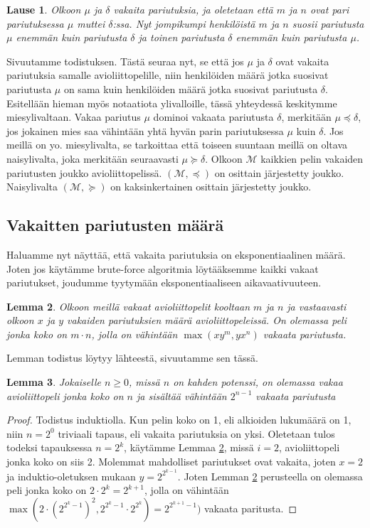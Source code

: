 \documentclass[finnish]{tktltiki2}
\newtheorem{lau}{Lause}
\newtheorem{lem}[lau]{Lemma}
\theoremstyle{definition}
\theoremstyle{remark}
\begin{document}
\begin{lau} \cite[p. 18]{gusfield1989stable}\label{lause-guspref}
	Olkoon $\mu$ ja $\delta$ vakaita pariutuksia, ja oletetaan että $m$ ja $n$ ovat pari pariutuksessa $\mu$ muttei $\delta$:ssa. Nyt jompikumpi henkilöistä $m$ ja $n$ suosii pariutusta $\mu$ enemmän kuin pariutusta $\delta$ ja toinen pariutusta $\delta$ enemmän kuin pariutusta $\mu$.
\end{lau}
Sivuutamme todistuksen.
Tästä seuraa nyt, se että jos $\mu$ ja $\delta$ ovat vakaita pariutuksia samalle avioliittopelille, niin henkilöiden määrä jotka suosivat pariutusta $\mu$ on sama kuin henkilöiden määrä jotka suosivat pariutusta $\delta$.
Esitellään hieman myös notaatiota ylivalloille, tässä yhteydessä keskitymme miesylivaltaan.
Vakaa pariutus $\mu$ dominoi vakaata pariutusta $\delta$, merkitään $\mu \preceq \delta$, jos jokainen mies saa vähintään yhtä hyvän parin pariutuksessa $\mu$ kuin $\delta$.
Jos meillä on yo. miesylivalta, se tarkoittaa että toiseen suuntaan meillä on oltava naisylivalta, joka merkitään seuraavasti $\mu \succeq \delta$. Olkoon $\mathcal{M}$ kaikkien pelin vakaiden pariutusten joukko avioliittopelissä. $(\mathcal{M}, \preceq)$ on osittain järjestetty joukko. Naisylivalta $(\mathcal{M}, \succeq)$ on kaksinkertainen osittain järjestetty joukko.

\subsection{Vakaitten pariutusten määrä}
Haluamme nyt näyttää, että vakaita pariutuksia on eksponentiaalinen määrä. Joten jos käytämme brute-force algoritmia löytääksemme kaikki vakaat pariutukset, joudumme tyytymään eksponentiaaliseen aikavaativuuteen.

\begin{lem} \cite[p. 23]{gusfield1989stable} \label{lemma-koko}
Olkoon meillä vakaat avioliittopelit kooltaan $m$ ja $n$ ja vastaavasti olkoon $x$ ja $y$ vakaiden pariutuksien määrä avioliittopeleissä. On olemassa peli jonka koko on $m \cdot n$, jolla on vähintään $\max(xy^m, yx^n)$ vakaata pariutusta.
\end{lem}
Lemman todistus löytyy lähteestä, sivuutamme sen tässä.

\begin{lem}\cite[p. 24]{gusfield1989stable}
Jokaiselle $n \geq 0$, missä $n$ on kahden potenssi, on olemassa vakaa avioliittopeli jonka koko on $n$ ja sisältää vähintään $2^{n-1}$ vakaata pariutusta
\end{lem}
\begin{proof}
Todistus induktiolla. Kun pelin koko on 1, eli alkioiden lukumäärä on 1, niin $n = 2^0$ triviaali tapaus, eli vakaita pariutuksia on yksi. Oletetaan tulos todeksi tapauksessa $n = 2^k$, käytämme Lemmaa \ref{lemma-koko}, missä $i = 2$, avioliittopeli jonka koko on siis 2. Molemmat mahdolliset pariutukset ovat vakaita, joten $x = 2$ ja induktio-oletuksen mukaan $y = 2^{2^{k-1}}$. Joten Lemman \ref{lemma-koko} perusteella on olemassa peli jonka koko on $2 \cdot 2^k = 2^{k+1}$, jolla on vähintään $\max(2 \cdot (2^{2^{{k}}-1})^2, 2^{2^{k}-1} \cdot 2^{2^{k}}) = 2^{2^{k+1}-1})$ vakaata paritusta.
\end{proof}
\end{document}
